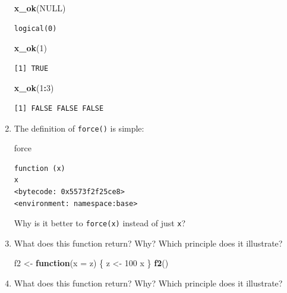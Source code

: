 \documentclass[]{book}
\newenvironment{Shaded}{\begin{snugshade}}{\end{snugshade}}
\newcommand{\ControlFlowTok}[1]{\textcolor[rgb]{0.13,0.29,0.53}{\textbf{#1}}}
\newcommand{\DataTypeTok}[1]{\textcolor[rgb]{0.13,0.29,0.53}{#1}}
\newcommand{\DecValTok}[1]{\textcolor[rgb]{0.00,0.00,0.81}{#1}}
\newcommand{\KeywordTok}[1]{\textcolor[rgb]{0.13,0.29,0.53}{\textbf{#1}}}
\newcommand{\NormalTok}[1]{#1}
\newcommand{\OperatorTok}[1]{\textcolor[rgb]{0.81,0.36,0.00}{\textbf{#1}}}
\newcommand{\OtherTok}[1]{\textcolor[rgb]{0.56,0.35,0.01}{#1}}
\newcommand{\StringTok}[1]{\textcolor[rgb]{0.31,0.60,0.02}{#1}}
\theoremstyle{definition}
\theoremstyle{definition}
\theoremstyle{definition}
\theoremstyle{remark}
\begin{document}
\begin{enumerate}
\begin{Shaded}
\begin{Highlighting}[]
\KeywordTok{x_ok}\NormalTok{(}\OtherTok{NULL}\NormalTok{)}
\end{Highlighting}
\end{Shaded}

\begin{verbatim}
logical(0)
\end{verbatim}

\begin{Shaded}
\begin{Highlighting}[]
\KeywordTok{x_ok}\NormalTok{(}\DecValTok{1}\NormalTok{)}
\end{Highlighting}
\end{Shaded}

\begin{verbatim}
[1] TRUE
\end{verbatim}

\begin{Shaded}
\begin{Highlighting}[]
\KeywordTok{x_ok}\NormalTok{(}\DecValTok{1}\OperatorTok{:}\DecValTok{3}\NormalTok{)}
\end{Highlighting}
\end{Shaded}

\begin{verbatim}
[1] FALSE FALSE FALSE
\end{verbatim}
\item
  The definition of \texttt{force()} is simple:

\begin{Shaded}
\begin{Highlighting}[]
\NormalTok{force}
\end{Highlighting}
\end{Shaded}

\begin{verbatim}
function (x) 
x
<bytecode: 0x5573f2f25ce8>
<environment: namespace:base>
\end{verbatim}

  Why is it better to \texttt{force(x)} instead of just \texttt{x}?
\item
  What does this function return? Why? Which principle does it
  illustrate?

\begin{Shaded}
\begin{Highlighting}[]
\NormalTok{f2 <-}\StringTok{ }\ControlFlowTok{function}\NormalTok{(}\DataTypeTok{x =}\NormalTok{ z) \{}
\NormalTok{  z <-}\StringTok{ }\DecValTok{100}
\NormalTok{  x}
\NormalTok{\}}
\KeywordTok{f2}\NormalTok{()}
\end{Highlighting}
\end{Shaded}
\item
  What does this function return? Why? Which principle does it
  illustrate?


\end{enumerate}
\end{document}
